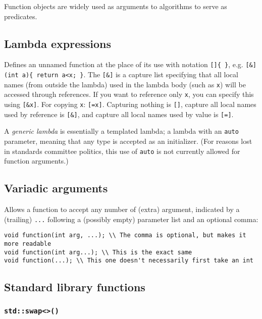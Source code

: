 \documentclass[8pt, table, xcdraw]{article}%
\begin{document}
Function objects are widely used as arguments to algorithms to serve as predicates.

\subsection{Lambda expressions}

Defines an unnamed function at the place of its use with notation \lstinline|[]{ }|, e.g. \lstinline|[&](int a){ return a<x; }|. The \lstinline{[&]} is a capture list specifying that all local names (from outside the lambda) used in the lambda body (such as \lstinline{x}) will be accessed through references. If you want to reference only \lstinline{x}, you can specify this using \lstinline{[&x]}. For copying \lstinline{x}: \lstinline{[=x]}. Capturing nothing is \lstinline{[]}, capture all local names used by reference is \lstinline{[&]}, and capture all local names used by value is \lstinline{[=]}.

A \textit{generic lambda} is essentially a templated lambda; a lambda with an \lstinline{auto} parameter, meaning that any type is accepted as an initializer. (For reasons lost in standards committee politics, this use of \lstinline{auto} is not currently allowed for function arguments.)

\subsection{Variadic arguments} \label{variadicarguments}

Allows a function to accept any number of (extra) argument, indicated by a (trailing) \lstinline{...} following a (possibly empty) parameter list and an optional comma:

\begin{lstlisting}
void function(int arg, ...); \\ The comma is optional, but makes it more readable
void function(int arg...); \\ This is the exact same
void function(...); \\ This one doesn't necessarily first take an int
\end{lstlisting}

\subsection{Standard library functions}

\subsubsection{\lstinline{std::swap<>()}}
\end{document}
